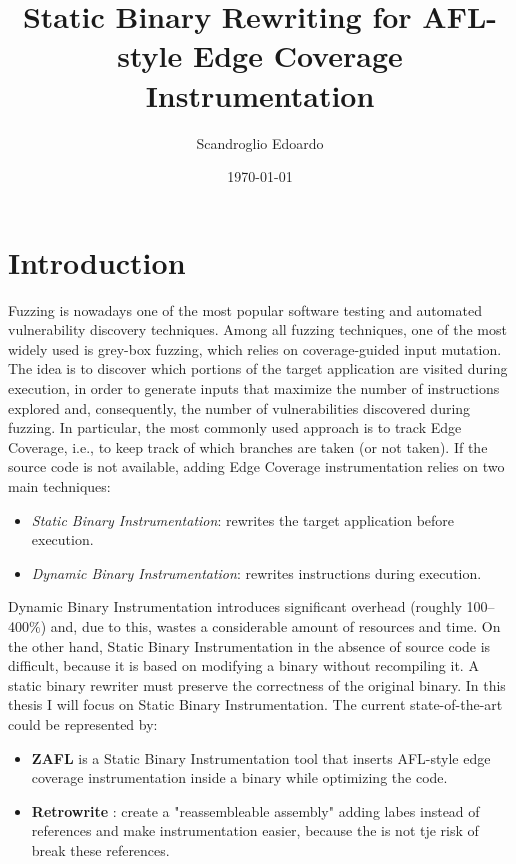 \documentclass{report}
\title{Static Binary Rewriting for AFL-style Edge Coverage Instrumentation}
\author{Scandroglio Edoardo}
\date{\today}
\begin{document}
    \maketitle
    \tableofcontents
    \chapter{Introduction}
        Fuzzing is nowadays one of the most popular software testing and automated vulnerability discovery techniques.
        Among all fuzzing techniques, one of the most widely used is grey-box fuzzing, which relies on coverage-guided input mutation.
        The idea is to discover which portions of the target application are visited during execution,
            in order to generate inputs that maximize the number of instructions explored and, consequently, the number of vulnerabilities discovered during fuzzing.
        In particular, the most commonly used approach is to track Edge Coverage, i.e., to keep track of which branches are taken (or not taken).
        If the source code is not available, adding Edge Coverage instrumentation relies on two main techniques:
        \begin{itemize} 
            \item \textit{Static Binary Instrumentation}: rewrites the target application before execution.
            \item \textit{Dynamic Binary Instrumentation}: rewrites instructions during execution.
        \end{itemize}
        Dynamic Binary Instrumentation introduces significant overhead (roughly 100--400\%) and, due to this, wastes a considerable amount of resources and time.
        On the other hand, Static Binary Instrumentation in the absence of source code is difficult, because it is based
            on modifying a binary without recompiling it. A static binary rewriter must preserve the correctness of the original binary.
        In this thesis I will focus on Static Binary Instrumentation. The current state-of-the-art could be represented by:
        \begin{itemize}
            \item \textbf{ZAFL} is a Static Binary Instrumentation tool that inserts AFL-style edge coverage instrumentation inside a binary while optimizing the code.
            \item \textbf{Retrowrite} : create a "reassembleable assembly" adding labes instead of references and make instrumentation easier, because the is not tje risk of break these references.   
        \end{itemize}
        
\end{document}
